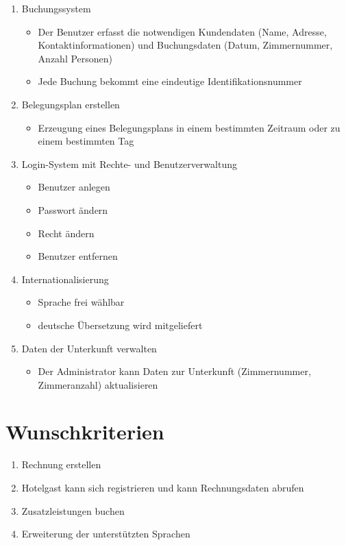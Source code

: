 \documentclass[a4paper,oneside]{scrreprt}
\begin{document}
\begin{enumerate}
\item Buchungssystem
    \begin{itemize}
    \item Der Benutzer erfasst die notwendigen Kundendaten (Name, Adresse, Kontaktinformationen) und Buchungsdaten (Datum, Zimmernummer, Anzahl Personen)
    \item Jede Buchung bekommt eine eindeutige Identifikationsnummer
    \end{itemize}

\item Belegungsplan erstellen
    \begin{itemize}
    \item Erzeugung eines Belegungsplans in einem bestimmten Zeitraum oder zu einem bestimmten Tag 
    \end{itemize}

\item Login-System mit Rechte- und Benutzerverwaltung
    \begin{itemize}
    \item Benutzer anlegen
    \item Passwort ändern
    \item Recht ändern
    \item Benutzer entfernen
    \end{itemize}

\item Internationalisierung
    \begin{itemize}
    \item Sprache frei wählbar
    \item deutsche Übersetzung wird mitgeliefert
    \end{itemize}

\item Daten der Unterkunft verwalten
    \begin{itemize}
    \item Der Administrator kann Daten zur Unterkunft (Zimmernummer, Zimmeranzahl) aktualisieren
    \end{itemize}
\end{enumerate}


\section{Wunschkriterien}

\begin{enumerate}
\item Rechnung erstellen
\item Hotelgast kann sich registrieren und kann Rechnungsdaten abrufen
\item Zusatzleistungen buchen
\item Erweiterung der unterstützten Sprachen
\end{enumerate}
\end{document}
